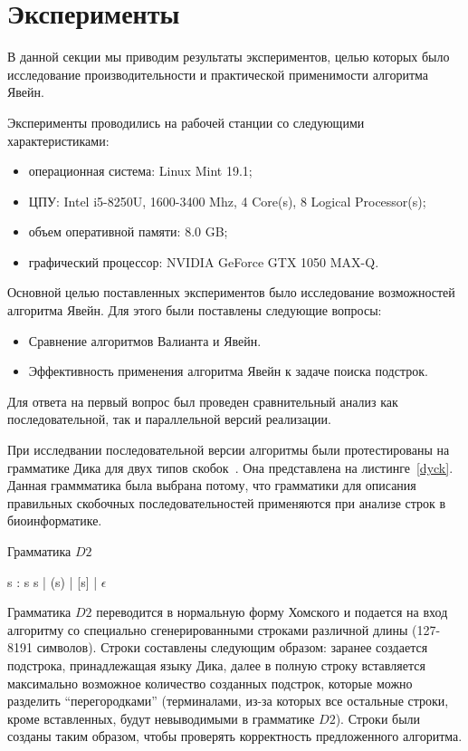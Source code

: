 \documentclass[14pt]{matmex-diploma-custom}
\begin{document}
\section{Эксперименты}

В данной секции мы приводим результаты экспериментов, целью которых было исследование производительности и практической применимости алгоритма Явейн.

Эксперименты проводились на рабочей станции со следующими характеристиками:
\begin{itemize}
    \item операционная система: Linux Mint 19.1;
    \item ЦПУ: Intel i5-8250U, 1600-3400 Mhz, 4 Core(s), 8 Logical Processor(s);
    \item объем оперативной памяти: 8.0 GB;
    \item графический процессор: NVIDIA GeForce GTX 1050 MAX-Q.
\end{itemize}

Основной целью поставленных экспериментов было исследование возможностей алгоритма Явейн.
Для этого были поставлены следующие вопросы:

\begin{itemize}
    \item Сравнение алгоритмов Валианта и Явейн.
    \item Эффективность применения алгоритма Явейн к задаче поиска подстрок.
\end{itemize}

Для ответа на первый вопрос был проведен сравнительный анализ как последовательной, так и параллельной версий реализации. 

При исследвании последовательной версии алгоритмы были протестированы на грамматике Дика для двух типов скобок~\cite{hopcroft1969formal}. Она представлена на листинге~\ref{dyck}. Данная граммматика была выбрана потому, что грамматики для описания правильных скобочных последовательностей применяются при анализе строк в биоинформатике. 

\begin{listing}
\caption{Грамматика $D2$}

\quad\quad\quad\quad\quad\quad\quad\quad\quad\quad\quad\quad s : s s  |  (s) |  [s]  |  $\epsilon$

\label{dyck}
\end{listing} 

Грамматика $D2$ переводится в нормальную форму Хомского и подается на вход алгоритму со специально сгенерированными строками различной длины (127-8191 символов). Строки составлены следующим образом: заранее создается подстрока, принадлежащая языку Дика, далее в полную строку вставляется максимально возможное количество созданных подстрок, которые можно разделить “перегородками” (терминалами, из-за которых все остальные строки, кроме вставленных, будут невыводимыми в грамматике $D2$). Строки были созданы таким образом, чтобы проверять корректность предложенного алгоритма.
\end{document}
